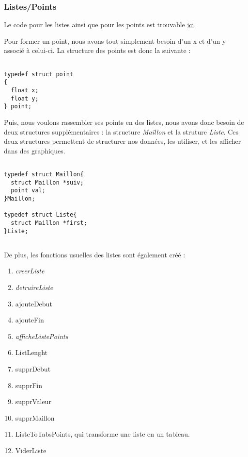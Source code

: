\documentclass[letter]{article}
\begin{document}
\subsubsection{Listes/Points}
\label{sec:org07c17e7}

Le code pour les listes ainsi que pour les points est trouvable \href{listePoint.c}{ici}.

Pour former un point, nous avons tout simplement besoin d'un x et d'un y associé à celui-ci.
La structure des points est donc la suivante :

\begin{verbatim}

typedef struct point
{
  float x;
  float y;
} point;

\end{verbatim}

Puis, nous voulons rassembler ses points en des listes, nous avons donc besoin de deux structures supplémentaires : la structure \emph{Maillon} et la struture \emph{Liste}. Ces deux structures permettent de structurer nos données, les utiliser, et les afficher dans des graphiques.

\begin{verbatim}

typedef struct Maillon{
  struct Maillon *suiv;
  point val;
}Maillon;

typedef struct Liste{
  struct Maillon *first;
}Liste;


\end{verbatim}

De plus, les fonctions usuelles des listes sont également créé :
\begin{enumerate}
\item \emph{creerListe}
\item \emph{detruireListe}
\item ajouteDebut
\item ajouteFin
\item \emph{afficheListePoints}
\item ListLenght
\item supprDebut
\item supprFin
\item supprValeur
\item supprMaillon
\item ListeToTabsPoints, qui transforme une liste en un tableau.
\item ViderListe
\end{enumerate}
\end{document}
